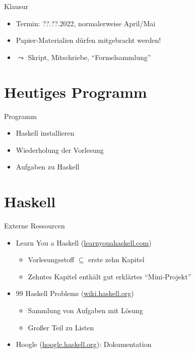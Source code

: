 \documentclass{beamer}
\begin{document}
\begin{frame}{Klausur}
        \begin{itemize}
                \item Termin: ??.??.2022, normalerweise April/Mai
                \item Papier-Materialien dürfen mitgebracht werden!
                \item $\leadsto$ Skript, Mitschriebe, \enquote{Formelsammlung}
        \end{itemize}
\end{frame}


\section{Heutiges Programm}
\begin{frame}{Programm}
        \begin{itemize}
                \item Haskell installieren
                \item Wiederholung der Vorlesung
                \item Aufgaben zu Haskell
        \end{itemize}
\end{frame}


\section{Haskell}

\begin{frame}{Externe Ressourcen}
  \begin{itemize}
    \item Learn You a Haskell (\href{http://learnyouahaskell.com}{learnyouahaskell.com})
    \begin{itemize}
      \item Vorlesungsstoff $\subseteq$ erste zehn Kapitel
      \item Zehntes Kapitel enthält gut erklärtes \enquote{Mini-Projekt}
    \end{itemize}
    \item 99 Haskell Problems (\href{https://wiki.haskell.org/H-99:_Ninety-Nine_Haskell_Problems}{wiki.haskell.org})
    \begin{itemize}
      \item Sammlung von Aufgaben mit Lösung
      \item Großer Teil zu Listen
    \end{itemize}
    \item Hoogle (\href{https://hoogle.haskell.org}{hoogle.haskell.org}): Dokumentation
  \end{itemize}
\end{frame}
\end{document}
